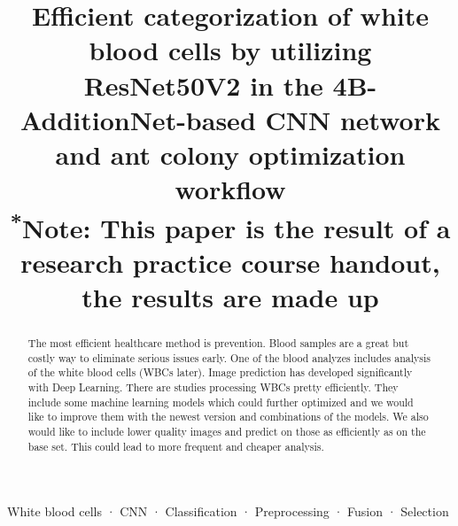 \documentclass[conference]{IEEEtran}
\begin{document}
\title{Efficient categorization of white blood cells by utilizing ResNet50V2 in the
4B-AdditionNet-based CNN network and ant colony optimization workflow\\
{\footnotesize \textsuperscript{*}Note: This paper is the result of a research practice course handout, the results are made up}
}

\author{
\and
{}
\and
{}
\and
{}
}

\maketitle

\begin{abstract}
The most efficient healthcare method is prevention. Blood samples are a great but costly way to eliminate serious issues early. One of the blood analyzes includes analysis of the white blood cells (WBCs later). Image prediction has developed significantly with Deep Learning. There are studies processing WBCs pretty efficiently. They include some machine learning models which could further optimized and we would like to improve them with the newest version and combinations of the models. We also would like to include lower quality images and predict on those as efficiently as on the base set. This could lead to more frequent and cheaper analysis.
\end{abstract}

\begin{IEEEkeywords}
White blood cells · CNN · Classification · Preprocessing · Fusion · Selection
\end{IEEEkeywords}
\end{document}
